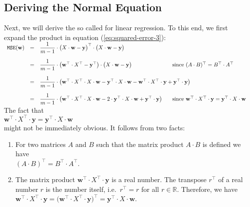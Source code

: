 \subsection{Deriving the Normal Equation}
Next, we will derive the so called  
for linear regression.  To this end, we first
expand the product in equation (\ref{eq:squared-error-3}):
\\[0.2cm]
\hspace*{0.3cm}
$
\begin{array}[t]{lcll}
 \mathtt{MSE}(\mathbf{w}) & = & 
 \ds \frac{1}{m-1} \cdot \bigl(X \cdot \mathbf{w} - \textbf{y}\bigr)^\top \cdot \bigl(X \cdot \mathbf{w} - \textbf{y}\bigr) 
 \\[0.5cm]
 & = & 
 \ds \frac{1}{m-1} \cdot \bigl(\mathbf{w}^\top \cdot X^\top - \textbf{y}^\top\bigr) \cdot \bigl(X \cdot \mathbf{w} - \textbf{y}\bigr) 
 & \hspace*{-1.5cm}\mbox{since $(A \cdot B)^\top = B^\top \cdot A^\top$}
 \\[0.5cm]
 & = & 
 \ds \frac{1}{m-1} \cdot \bigl(\mathbf{w}^\top \cdot X^\top \cdot X \cdot \mathbf{w} 
                             - \textbf{y}^\top \cdot X \cdot \mathbf{w} 
                             - \mathbf{w}^\top \cdot X^\top \cdot \mathbf{y}
                             + \mathbf{y}^\top \cdot \mathbf{y}
                       \bigr)
 \\[0.5cm]
 & = & 
 \ds \frac{1}{m-1} \cdot \bigl(\mathbf{w}^\top \cdot X^\top \cdot X \cdot \mathbf{w} 
                             - 2 \cdot \textbf{y}^\top \cdot X \cdot \mathbf{w} 
                             + \mathbf{y}^\top \cdot \mathbf{y}
                       \bigr)
 & \hspace*{-1.5cm}\mbox{since $\mathbf{w}^\top \cdot X^\top \cdot \mathbf{y} = \textbf{y}^\top \cdot X \cdot \mathbf{w}$}
\end{array}
$
\\[0.2cm]
The fact that 
\\[0.2cm]
\hspace*{1.3cm}
$\mathbf{w}^\top \cdot X^\top \cdot \mathbf{y} = \textbf{y}^\top \cdot X \cdot \mathbf{w}$
\\[0.2cm]
might not be immediately obvious.  It follows from two facts:
\begin{enumerate}
\item For two matrices $A$ and $B$ such that the matrix product $A \cdot B$ is defined we have 
      \\[0.2cm]
      \hspace*{1.3cm}
      $(A \cdot B)^\top = B^\top \cdot A^\top$.
\item The matrix product $\mathbf{w}^\top \cdot X^\top \cdot \mathbf{y}$ is a real number.  The transpose $r^\top$ of a real number $r$ is the number
      itself, i.e.~$r^\top = r$ for all $r \in \mathbb{R}$.  Therefore, we have
      \\[0.2cm]
      \hspace*{1.3cm}
      $\mathbf{w}^\top \cdot X^\top \cdot \mathbf{y} = 
\bigl(\mathbf{w}^\top \cdot X^\top \cdot \mathbf{y}\bigr)^\top =
\mathbf{y}^\top \cdot X \cdot \mathbf{w}
$.
\end{enumerate}
